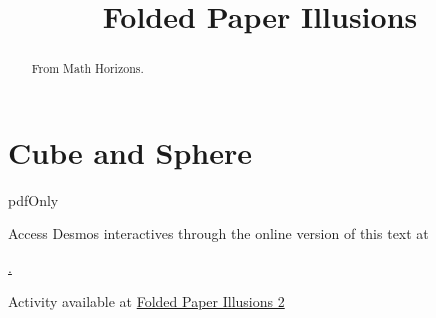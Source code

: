 \documentclass{ximera}
\title{Folded Paper Illusions}
\begin{document}
\begin{abstract}
From Math Horizons.
\end{abstract}
\maketitle


 
\begin{onlineOnly}
    \begin{center}
\end{center}
\end{onlineOnly}





\section*{Cube and Sphere}


pdfOnly{
Access Desmos interactives through the online version of this text at
 
\href{https://www.desmos.com/calculator/829edf2d9b}.
}
 
\begin{onlineOnly}
    \begin{center}
\end{center}
\end{onlineOnly}

Activity available at  \href{https://www.desmos.com/calculator/829edf2d9b}{Folded Paper Illusions 2}
\end{document}
